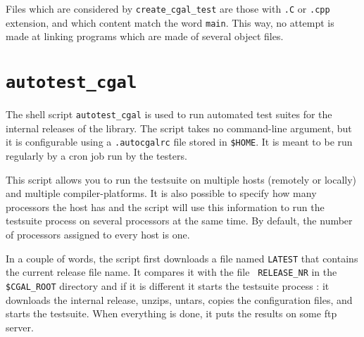 Files which are considered by {{\tt create\_cgal\_test}} are those with
{\tt .C} or {\tt .cpp} extension, and which content match the word {\tt main}.
This way, no attempt is made at linking programs which are made of several
object files.


\section{{\tt autotest\_cgal}}
\label{sec:autotest_cgal}

The shell script {\tt autotest\_cgal} is used to run automated test suites for
the internal releases of the library. The script takes no command-line
argument, but it is configurable using a {\tt .autocgalrc} file stored
in {\tt \$HOME}.
It is meant to be run regularly by a cron job run by the testers.

This script allows you to run the testsuite on multiple hosts (remotely or
locally) and multiple compiler-platforms. It is also possible to specify how
many processors the host has and the script will use this information to run
the testsuite process on several processors at the same time. By default, the
number of processors assigned to every host is one.

In a couple of words, the script first downloads a file named {\tt LATEST}
that contains the current release file name. It compares it with the file {\tt
RELEASE\_NR} in the {\tt \$CGAL\_ROOT} directory and if it is different it
starts the testsuite process : it downloads the internal release, unzips,
untars, copies the configuration files, and starts the testsuite. When
everything is done, it puts the results on some ftp server.

